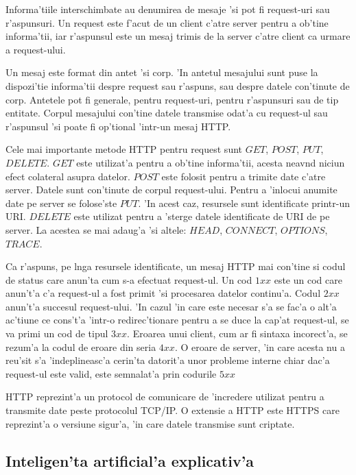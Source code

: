 \documentclass[12pt,a4paper,twoside]{report}
\begin{document}
Informa'tiile interschimbate au denumirea de mesaje 'si pot fi request-uri sau r'aspunsuri. Un request este f'acut de un client c'atre server pentru a ob'tine informa'tii, iar r'aspunsul este un mesaj trimis de la server c'atre client ca urmare a request-ului. 

Un mesaj este format din antet 'si corp. 'In antetul mesajului sunt puse la dispozi'tie informa'tii despre request sau r'aspuns, sau despre datele con'tinute de corp. Antetele pot fi generale, pentru request-uri, pentru r'aspunsuri sau de tip entitate. Corpul mesajului con'tine datele transmise odat'a cu request-ul sau r'aspunsul 'si poate fi op'tional 'intr-un mesaj HTTP. 

Cele mai importante metode HTTP pentru request sunt $GET$, $POST$, $PUT$, $DELETE$.
 $GET$ este utilizat'a pentru a ob'tine informa'tii, acesta neav\ia nd niciun efect colateral asupra datelor.
 $POST$ este folosit pentru a trimite date c'atre server. Datele sunt con'tinute de corpul request-ului.
 Pentru a 'inlocui anumite date pe server se folose'ste $PUT$. 'In acest caz, resursele sunt identificate printr-un URI. $DELETE$ este utilizat pentru a 'sterge datele identificate de URI de pe server.
La acestea se mai adaug'a 'si altele: $HEAD$, $CONNECT$, $OPTIONS$, $TRACE$.

Ca r'aspuns, pe l\ia nga resursele identificate, un mesaj HTTP mai con'tine si codul de status care anun'ta cum s-a efectuat request-ul. Un cod $1xx$ este un cod care anun't'a c'a request-ul a fost primit 'si procesarea datelor continu'a. Codul $2xx$ anun't'a succesul request-ului. 'In cazul 'in care este necesar s'a se fac'a o alt'a ac'tiune ce cons't'a 'intr-o redirec'tionare pentru a se duce la cap'at request-ul, se va primi un cod de tipul $3xx$. Eroarea unui client, cum ar fi sintaxa incorect'a, se rezum'a la codul de eroare din seria $4xx$. O eroare de server, 'in care acesta nu a reu'sit s'a 'indeplineasc'a cerin'ta datorit'a unor probleme interne chiar dac'a request-ul este valid, este semnalat'a prin codurile $5xx$

HTTP reprezint'a un protocol de comunicare de 'incredere utilizat pentru a transmite date peste protocolul TCP/IP. O extensie a HTTP este HTTPS care reprezint'a o versiune sigur'a, 'in care datele transmise sunt criptate.


\subsection{Inteligen'ta artificial'a explicativ'a}
\end{document}
